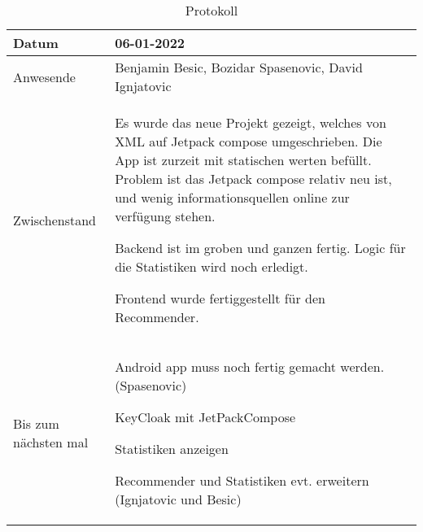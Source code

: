 \begin{table}
    \begin{tabular}{ |p{3cm}|p{10cm}|   }
        \hline
        Datum & 06-01-2022\\
        \hline
        Anwesende & Benjamin Besic, Bozidar Spasenovic, David Ignjatovic\\

        \hline
        Zwischenstand& Es wurde das neue Projekt gezeigt, welches von XML auf Jetpack compose umgeschrieben.
        Die App ist zurzeit mit statischen werten befüllt.
        Problem ist das Jetpack compose relativ neu ist, und wenig informationsquellen online zur verfügung stehen.
        
        Backend ist im groben und ganzen fertig. Logic für die Statistiken wird noch erledigt.
        
        Frontend wurde fertiggestellt für den Recommender.\\
        \hline
        Bis zum nächsten mal &  





        Android app muss noch fertig gemacht werden. (Spasenovic)

        KeyCloak mit JetPackCompose
    
        Statistiken anzeigen
    
        Recommender und Statistiken evt. erweitern (Ignjatovic und Besic)
    
    


    
    \\
        \hline
    \end{tabular}
    \caption{Protokoll}
    \label{tab:my_label}
\end{table}
